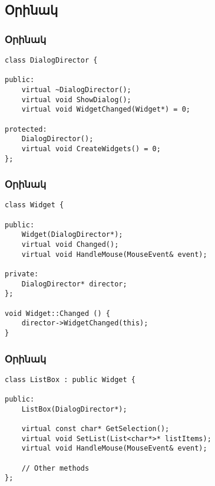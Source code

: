 \documentclass{beamer}
\begin{document}
\subsection{Օրինակ}
\begin{frame}[fragile]\frametitle{Օրինակ}
\begin{english}
\begin{verbatim}
class DialogDirector {

public:
    virtual ~DialogDirector();
    virtual void ShowDialog();
    virtual void WidgetChanged(Widget*) = 0;

protected:
    DialogDirector();
    virtual void CreateWidgets() = 0;
};
\end{verbatim}
\end{english}
\end{frame}

\begin{frame}[fragile]\frametitle{Օրինակ}
\begin{english}
\begin{verbatim}
class Widget {

public:
    Widget(DialogDirector*);
    virtual void Changed();
    virtual void HandleMouse(MouseEvent& event);

private:
    DialogDirector* director;
};

void Widget::Changed () {
    director->WidgetChanged(this);
}
\end{verbatim}
\end{english}
\end{frame}

\begin{frame}[fragile]\frametitle{Օրինակ}
\begin{english}
\begin{verbatim}
class ListBox : public Widget {

public:
    ListBox(DialogDirector*);

    virtual const char* GetSelection();
    virtual void SetList(List<char*>* listItems);
    virtual void HandleMouse(MouseEvent& event);

    // Other methods
};
\end{verbatim}
\end{english}
\end{frame}
\end{document}
